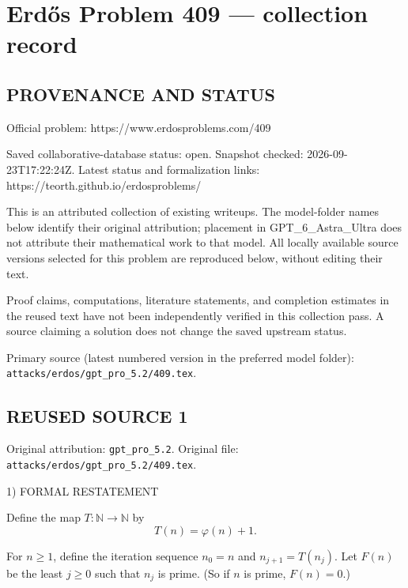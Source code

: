 \section*{Erd\H{o}s Problem 409 --- collection record}

\subsection*{PROVENANCE AND STATUS}
Official problem: https://www.erdosproblems.com/409

Saved collaborative-database status: open.
Snapshot checked: 2026-09-23T17:22:24Z.
Latest status and formalization links: https://teorth.github.io/erdosproblems/

This is an attributed collection of existing writeups. The model-folder names below identify their original attribution; placement in GPT\_6\_Astra\_Ultra does not attribute their mathematical work to that model. All locally available source versions selected for this problem are reproduced below, without editing their text.

Proof claims, computations, literature statements, and completion estimates in the reused text have not been independently verified in this collection pass. A source claiming a solution does not change the saved upstream status.

Primary source (latest numbered version in the preferred model folder): \texttt{attacks/erdos/gpt\_pro\_5.2/409.tex}.

\subsection*{REUSED SOURCE 1}
Original attribution: \texttt{gpt\_pro\_5.2}.
Original file: \texttt{attacks/erdos/gpt\_pro\_5.2/409.tex}.


1) FORMAL RESTATEMENT

Define the map $T:\mathbb N\to\mathbb N$ by
\[
T(n)=\varphi(n)+1.
\]

For $n\ge 1$, define the iteration sequence $n_0=n$ and $n_{j+1}=T(n_j)$.
Let $F(n)$ be the least $j\ge 0$ such that $n_j$ is prime.
(So if $n$ is prime, $F(n)=0$.)

